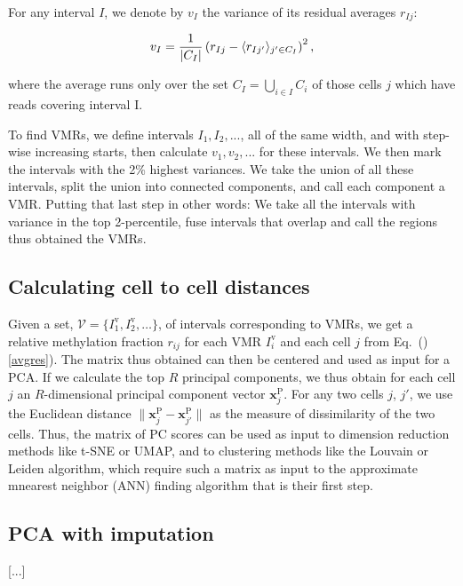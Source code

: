 \documentclass[twocolumn,10pt]{article}
\begin{document}
For any interval $I$, we denote by $v_I$ the variance of its residual averages $r_{Ij}$:

$$ v_I = \frac{\scriptsize{1}}{\scriptsize{|C_I|}}\left( r_{Ij} - \langle r_{Ij'}\rangle_{j'\in C_I} \right)^2,$$

where the average runs only over the set $C_I=\bigcup_{i\in I}C_i$ of those cells $j$ which have reads covering interval I.

To find VMRs, we define intervals $I_1, I_2, ...$, all of the same width, and with step-wise increasing starts, then calculate $v_1, v_2, ...$ for these intervals. We then mark the intervals with the 2\% highest variances. We take the union of all these intervals, split the union into connected components, and call each component a VMR. Putting that last step in other words: We take all the intervals with variance in the top 2-percentile, fuse intervals that overlap and call the regions thus obtained the VMRs.

\subsection{Calculating cell to cell distances}

Given a set, $\mathcal{V}=\{I^\text{v}_1,I^\text{v}_2,\dots\}$, of intervals corresponding to VMRs, we get a relative methylation fraction $r_{ij}$ for each VMR $I^\text{v}_i$ and each cell $j$ from Eq.\ ()\ref{avgres}). The matrix thus obtained can then be centered and used as input for a PCA. If we calculate the top $R$ principal components, we thus obtain for each cell $j$ an $R$-dimensional principal component vector $\mathbf{x}^\text{P}_j$. For any two cells $j$, $j'$, we use the Euclidean distance $\|\mathbf{x}^\text{P}_j - \mathbf{x}^\text{P}_{j'}\|$ as the measure of dissimilarity of the two cells.
Thus, the matrix of PC scores can be used as input to dimension reduction methods like t-SNE or UMAP, and to clustering methods like the Louvain or Leiden algorithm, which require such a matrix as input to the approximate mnearest neighbor (ANN) finding algorithm that is their first step.

\subsection{PCA with imputation}
[...]
\end{document}
